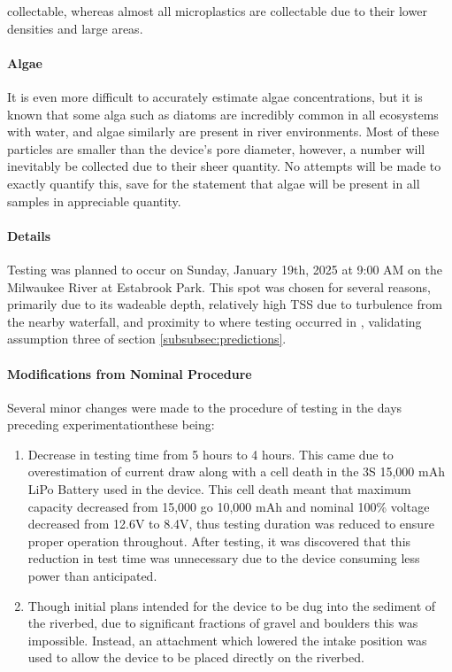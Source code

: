 \documentclass[fleqn,10pt]{SelfArx} %
\begin{document}
collectable, whereas almost all microplastics are collectable due to their lower densities and large areas.
	\paragraph{Algae}
	It is even more difficult to accurately estimate algae concentrations, but it is known that some alga such as diatoms are incredibly common in all ecosystems with water, and algae similarly are present in river environments. Most of these particles are smaller than the device's pore diameter, however, a number will inevitably be collected due to their sheer quantity. No attempts will be made to exactly quantify this, save for the statement that algae will be present in all samples in appreciable quantity. 
	\paragraph*{Details}
	Testing was planned to occur on Sunday, January 19th, 2025 at 9:00 AM on the Milwaukee River at Estabrook Park. This spot was chosen for several reasons, primarily due to its wadeable depth, relatively high TSS due to turbulence from the nearby waterfall, and proximity to where testing occurred in \cite{LenakerEtAlvertdist}, validating assumption three of section \ref{subsubsec:predictions}. 
	\paragraph*{Modifications from Nominal Procedure}
	\label{sec:mods}
	Several minor changes were made to the procedure of testing in the days preceding experimentation\textemdash these being:
	\begin{enumerate}
		\item Decrease in testing time from 5 hours to 4 hours. This came due to overestimation of current draw along with a cell death in the 3S 15,000 mAh LiPo Battery used in the device. This cell death meant that maximum capacity decreased from 15,000 go 10,000 mAh and nominal 100\% voltage decreased from 12.6V to 8.4V, thus testing duration was reduced to ensure proper operation throughout. After testing, it was discovered that this reduction in test time was unnecessary due to the device consuming less power than anticipated. 
		\item Though initial plans intended for the device to be dug into the sediment of the riverbed, due to significant fractions of gravel and boulders this was impossible. Instead, an attachment which lowered the intake position was used to allow the device to be placed directly on the riverbed. 
	\end{enumerate}
\end{document}
